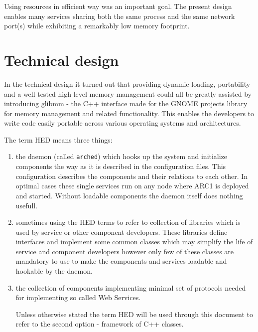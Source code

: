 \documentclass{book}
\begin{document}
Using resources in efficient way was an important goal. The present design enables many services sharing both the same process and the same network port(s) while exhibiting a remarkably low memory footprint.




\section{Technical design}

In the technical design it turned out that providing dynamic loading, portability and a well tested high level memory management could all be greatly assisted by introducing glibmm \cite{gtkmm} - the C++ interface made for the GNOME \cite{gnome} projects library for memory management and related functionality. This enables the developers to write code easily portable across various operating systems and architectures.


The term HED means three things:
\begin{enumerate}

\item the daemon (called \texttt{arched}) which hooks up the system and initialize components the way as it is described in the configuration files. This configuration describes the components and their relations to each other. In optimal cases these single services run on any node where ARC1 is deployed and started. Without loadable components the daemon itself does nothing usefull.

\item sometimes using the HED terms to refer to collection of libraries which is used by service or other component developers. These libraries define interfaces and implement some common classes which may simplify the life of service and component developers however only few of these classes are mandatory to use to make the components and services loadable and hookable by the daemon.

\item the collection of components implementing minimal set of protocols needed for implementing so called Web Services.

Unless otherwise stated the term HED will be used through this document to refer to the second option - framework of C++ classes.

\end{enumerate}
\end{document}
